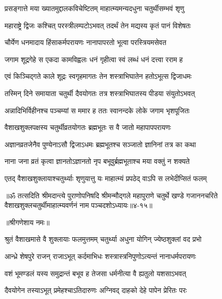 \twolineshloka
{प्रसङ्गात्ते मया ख्यातमुद्दालकविचेष्टितम्}
{माहात्म्यमन्यदधुना चतुर्थीसम्भवं श‍ृणु} %

\twolineshloka
{महाराष्ट्रे द्विजः कश्चित् परस्त्रीलम्पटोऽभवत्}
{तदर्थं तेन मद्यस्य कृतं पानं विशेषतः} %

\twolineshloka
{चौर्येण धनमादाय हिंसाकर्मपरायणः}
{नानापापरतो भूत्वा परस्त्रियमसेवत} %

\twolineshloka
{जगाम शूद्रगेहे स एकदा कामविह्वलः}
{धनं गृहीत्वा स्वं लब्धं धनं दत्त्वा रराम ह} %

\twolineshloka
{एवं किञ्चिद्गते काले शूद्रः स्वगृहमागतः}
{तेन शस्त्राभिघातेन हतोऽभूत्स द्विजाधमः} %

\twolineshloka
{तस्मिन् दिने समायाता चतुर्थी दैवयोगतः}
{तत्र शस्त्राभिघातस्य पीडया संयुतोऽभवत्} %

\twolineshloka
{अन्नादिभिर्विहीनश्च पञ्चम्यां स ममार ह}
{ततः स्वानन्दके लोके जगाम भृशपूजितः} %

\twolineshloka
{वैशाखशुक्लपक्षस्य चतुर्थीव्रतयोगतः}
{ब्रह्मभूतः स वै जातो महापापपरायणः} %

\twolineshloka
{अज्ञानव्रतजेनैव पुण्येनाऽसौ द्विजाऽधमः}
{ब्रह्मभूतश्च सञ्जातो ज्ञानिनां तत्र का कथा} %

\twolineshloka
{नाना जना व्रतं कृत्वा ज्ञानतोऽज्ञानतो नृप}
{बभूवुर्ब्रह्मभूताश्च मया वक्तुं न शक्यते} %

\twolineshloka
{एतद् वैशाखशुक्लायाश्चतुर्थ्याः श‍ृणुयात्तु यः}
{माहात्म्यं प्रपठेद् वाऽपि स लभेदीप्सितं फलम्} %

॥ॐ तत्सदिति श्रीमदान्त्ये पुराणोपनिषदि श्रीमन्मौद्गले महापुराणे चतुर्थे खण्डे गजाननचरिते वैशाखशुक्लचतुर्थीमाहात्म्यवर्णनं नाम पञ्चदशोऽध्यायः॥४-१५॥


\label{sec:jyeshtha-shukla-chaturthi-mahatmya-varnanam}

\centerline{॥श्रीगणेशाय नमः॥}


\twolineshloka
{श्रुतं वैशाखमासे वै शुक्लायाः फलमुत्तमम्}
{चतुर्थ्या अधुना योगिन् ज्येष्ठशुक्लां वद प्रभो} %


\twolineshloka
{आन्ध्रे शेषपुरे राजन् राजाऽभूत् कर्दमाभिधः}
{शस्त्रास्त्रनिपुणोऽत्यन्तं नानाधर्मपरायणः} %

\twolineshloka
{वशं भूमण्डलं यस्य समुद्रान्तं बभूव ह}
{तेजसा धर्मनीत्या वै ह्यतुलो यशसाऽभवत्} %

\twolineshloka
{दैवयोगेन तस्याऽभूत् प्रमेहश्चाऽतिदारुणः}
{अग्निवद् दाहको देहे पापेन प्रेरितः परः} %

